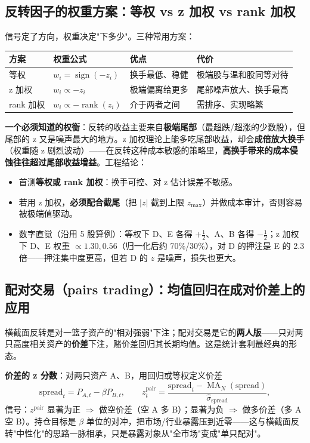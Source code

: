\documentclass[UTF8,11pt]{ctexart}
\begin{document}
\subsection{反转因子的权重方案：等权 vs z 加权 vs rank 加权}
信号定了方向，权重决定"下多少"。三种常用方案：
\begin{center}
\renewcommand{\arraystretch}{1.4}
\begin{tabular}{@{}llll@{}}
\toprule
方案 & 权重公式 & 优点 & 代价 \\
\midrule
等权 & $w_i=\operatorname{sign}(-z_i)$ & 换手最低、稳健 & 极端股与温和股同等对待 \\
z 加权 & $w_i\propto -z_i$ & 极端偏离给更多 & 尾部噪声放大、换手最高 \\
rank 加权 & $w_i\propto -\operatorname{rank}(z_i)$ & 介于两者之间 & 需排序、实现略繁 \\
\bottomrule
\end{tabular}
\end{center}
\textbf{一个必须知道的权衡}：反转的收益主要来自\textbf{极端尾部}（最超跌/超涨的少数股），但尾部的 z 又是噪声最大的地方。z 加权理论上能多吃尾部收益，却会\textbf{成倍放大换手}（权重随 z 剧烈波动）——在反转这种成本敏感的策略里，\textbf{高换手带来的成本侵蚀往往超过尾部收益增益}。工程结论：
\begin{itemize}[itemsep=2pt]
\item 首测\textbf{等权或 rank 加权}：换手可控、对 z 估计误差不敏感。
\item 若用 z 加权，\textbf{必须配合截尾}（把 $|z|$ 截到上限 $z_{\max}$）并做成本审计，否则容易被极端值驱动。
\item 数字直觉（沿用 5 股算例）：等权下 D、E 各得 $+\tfrac12$、A、B 各得 $-\tfrac12$；z 加权下 D、E 权重 $\propto1.30,0.56$（归一化后约 70\%/30\%），对 D 的押注是 E 的 2.3 倍——押注集中度更高，但若 D 的 $z$ 是噪声，损失也更大。
\end{itemize}

\subsection{配对交易（pairs trading）：均值回归在成对价差上的应用}
横截面反转是对一篮子资产的"相对强弱"下注；配对交易是它的\textbf{两人版}——只对两只高度相关资产的\textbf{价差}下注，赌价差回归其长期均值。这是统计套利最经典的形态。

\textbf{价差的 z 分数}：对两只资产 A、B，用回归或等权定义价差
\begin{equation}
\text{spread}_t = P_{A,t} - \beta P_{B,t},\qquad
z^{\text{pair}}_t = \frac{\text{spread}_t - \operatorname{MA}_N(\text{spread})}{\hat\sigma_{\text{spread}}},
\end{equation}
信号：$z^{\text{pair}}$ 显著为正 $\Rightarrow$ 做空价差（空 A 多 B）；显著为负 $\Rightarrow$ 做多价差（多 A 空 B）。持仓目标是 $\beta$ 单位的对冲，把市场/行业暴露压到近零——这与横截面反转"中性化"的思路一脉相承，只是暴露对象从"全市场"变成"单只配对"。
\end{document}
